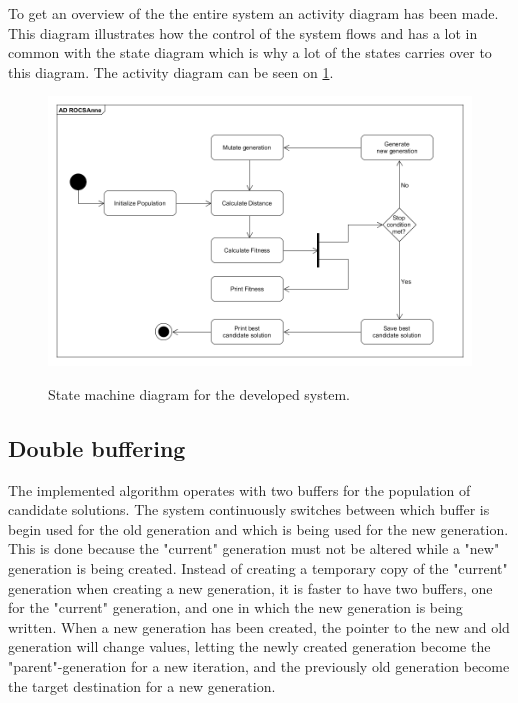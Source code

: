 To get an overview of the the entire system an activity diagram has been made. This diagram illustrates how the control of the system flows and has a lot in common with the state diagram which is why a lot of the states carries over to this diagram. The activity diagram can be seen on \cref{fig:Activity_diagram}.

\begin{figure}[H]
	\centering
	{\includegraphics[width=\textwidth]{Images/AD_ROGSAnne.PNG}}\\[0.5cm]
	\caption{State machine diagram for the developed system.}
	\label{fig:Activity_diagram}
\end{figure}



\subsection{Double buffering}
The implemented algorithm operates with two buffers for the population of candidate solutions. The system continuously switches between which buffer is begin used for the old generation and which is being used for the new generation. This is done because the "current" generation must not be altered while a "new" generation is being created. Instead of creating a temporary copy of the "current" generation when creating a new generation, it is faster to have two buffers, one for the "current" generation, and one in which the new generation is being written. When a new generation has been created, the pointer to the new and old generation will change values, letting the newly created generation become the "parent"-generation for a new iteration, and the previously old generation become the target destination for a new generation.


